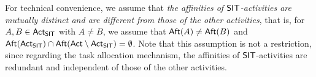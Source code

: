For technical convenience, we assume that \emph{the affinities of ${\sf SIT}$-activities are mutually distinct and are different from those of the other activities}, that is, for $A, B \in {\sf Act}_{\sf SIT}$ with $A \neq B$, we assume that  ${\sf Aft}(A) \neq {\sf Aft}(B)$ and ${\sf Aft}({\sf Act}_{\sf SIT}) \cap {\sf Aft}({\sf Act} \setminus {\sf Act}_{\sf SIT}) = \emptyset$.
%
Note that this assumption is not a restriction, since regarding the task allocation mechanism, the affinities of ${\sf SIT}$-activities are redundant and independent of those of the other activities. 



